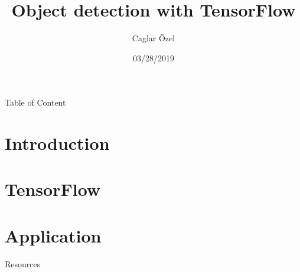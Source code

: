 \documentclass[11pt]{beamer}
\title{Object detection with TensorFlow}
\date{03/28/2019}
\author{Caglar Özel}
\institute{HTW Berlin}
\begin{document}
\begin{frame}
    \titlepage
\end{frame}

\begin{frame}{Table of Content}
    \tableofcontents
\end{frame}

\section{Introduction}


\section{TensorFlow}


\section{Application}


\begin{frame}{Resources}
    
\end{frame}
\end{document}

